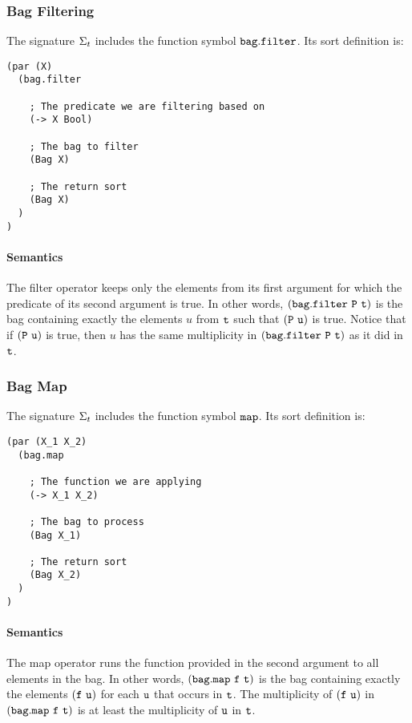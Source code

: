 \documentclass[english,a4paper,10pt]{article}
\begin{document}
\subsubsection{Bag Filtering}
The signature $\Sigma_{t}$ includes 
the function symbol ${\tt bag.filter}$. Its sort definition is:

\begin{verbatim}
(par (X)
  (bag.filter
  
    ; The predicate we are filtering based on
    (-> X Bool)
  
    ; The bag to filter
    (Bag X)
    
    ; The return sort
    (Bag X)
  )
)
\end{verbatim}

\paragraph{Semantics}
The filter operator keeps only the elements
from its first argument
for which the predicate of its second argument is true.
In other words,
${\tt (bag.filter\ P\ t)}$
is the bag containing exactly
the elements $u$ from ${\tt t}$
such that ${\tt (P\ u)}$ is true.
Notice that if ${\tt (P\ u)}$ is true,
then $u$ has the same multiplicity in ${\tt (bag.filter\ P\ t)}$
as it did in ${\tt t}$.

\subsubsection{Bag Map}
The signature $\Sigma_{t}$ includes 
the function symbol ${\tt map}$. Its sort definition is:

\begin{verbatim}
(par (X_1 X_2)
  (bag.map
    
    ; The function we are applying
    (-> X_1 X_2)
  
    ; The bag to process
    (Bag X_1)
    
    ; The return sort
    (Bag X_2)
  )
)
\end{verbatim}

\paragraph{Semantics}
The map operator runs the function provided
in the second argument to all elements in the bag.
In other words,
${\tt (bag.map\ f\ t)}$
is the bag containing exactly
the elements $\syntax{(f\ u)}$
for each ${\tt u}$ that occurs in ${\tt t}$.
The multiplicity of $\syntax{(f\ u)}$
in ${\tt (bag.map\ f\ t)}$
is at least the multiplicity of ${\tt u}$ in ${\tt t}$.
\end{document}
